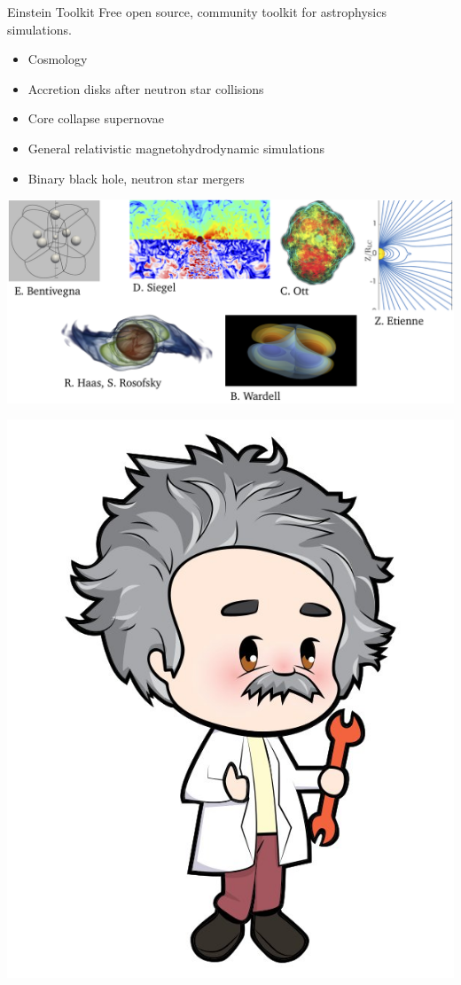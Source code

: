 \documentclass{beamer}
\begin{document}
\begin{frame}{Einstein Toolkit}\small
Free open source, community toolkit for astrophysics simulations.
\begin{itemize}
    \item Cosmology
    \item Accretion disks after neutron star collisions
    \item Core collapse supernovae
    \item General relativistic magnetohydrodynamic simulations 
    \item Binary black hole, neutron star mergers
\end{itemize}

\begin{center}
    \includegraphics[scale=0.3]{ET1.png}
\end{center}
\begin{flushright}
    \includegraphics[scale=0.1]{einstein_right.jpg}
\end{flushright}
\end{frame}
\end{document}
